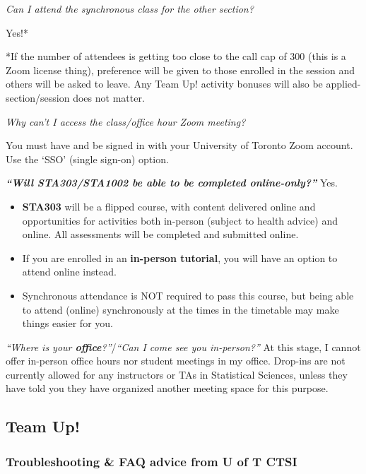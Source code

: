 \documentclass[
  openany]{book}
\begin{document}
\emph{Can I attend the synchronous class for the other section?}

Yes!*

*If the number of attendees is getting too close to the call cap of 300 (this is a Zoom license thing), preference will be given to those enrolled in the session and others will be asked to leave. Any Team Up! activity bonuses will also be applied-section/session does not matter.

\emph{Why can't I access the class/office hour Zoom meeting?}

You must have and be signed in with your University of Toronto Zoom account. Use the `SSO' (single sign-on) option.

\textbf{\emph{``\textbf{Will STA303/STA1002 be able to be }completed online-only?''}} Yes.

\begin{itemize}
\item
  \textbf{STA303} will be a flipped course, with content delivered online and opportunities for activities both in-person (subject to health advice) and online. All assessments will be completed and submitted online.
\item
  If you are enrolled in an \textbf{in-person tutorial}, you will have an option to attend online instead.
\item
  Synchronous attendance is NOT required to pass this course, but being able to attend (online) synchronously at the times in the timetable may make things easier for you.
\end{itemize}

\emph{``Where is your \textbf{office}?''}/\emph{``Can I come see you in-person?''} At this stage, I cannot offer in-person office hours nor student meetings in my office. Drop-ins are not currently allowed for any instructors or TAs in Statistical Sciences, unless they have told you they have organized another meeting space for this purpose.

\hypertarget{team-up}{%
\subsection{Team Up!}\label{team-up}}

\hypertarget{troubleshooting-faq-advice-from-u-of-t-ctsi}{%
\subsubsection{Troubleshooting \& FAQ advice from U of T CTSI}\label{troubleshooting-faq-advice-from-u-of-t-ctsi}}
\end{document}
